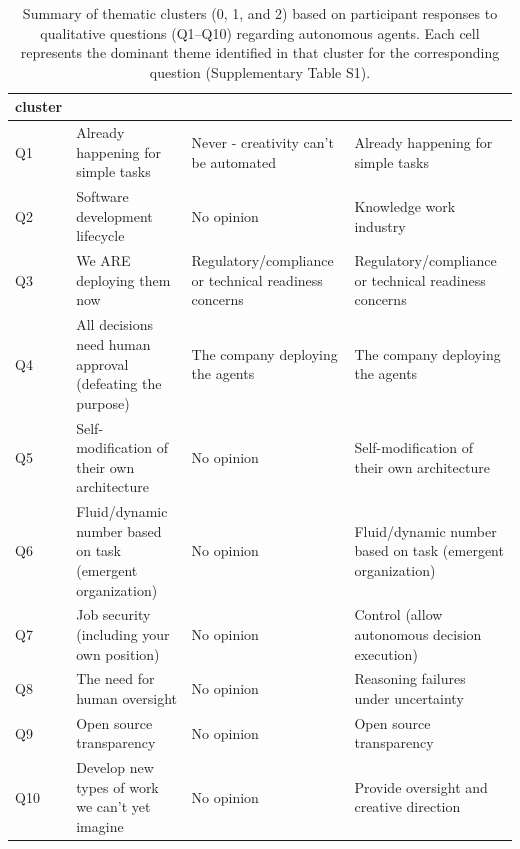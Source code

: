 \documentclass{article}
\begin{document}
\begin{table}[htbp]
	\caption{Summary of thematic clusters (0, 1, and 2) based on participant responses to qualitative questions (Q1--Q10) regarding autonomous agents. Each cell represents the dominant theme identified in that cluster for the corresponding question (Supplementary Table S1).}\label{table:kmodes_clusters}
	\centering
	\begin{tabularx}{\textwidth}{l>{\raggedright\arraybackslash}X >{\raggedright\arraybackslash}X >{\raggedright\arraybackslash}X}
		\toprule
		cluster & 0                                                          & 1                                                     & 2                                                          \\
		\midrule
		Q1      & Already happening for simple tasks                         & Never - creativity can't be automated                 & Already happening for simple tasks                         \\
		Q2      & Software development lifecycle                             & No opinion                                            & Knowledge work industry                                    \\
		Q3      & We ARE deploying them now                                  & Regulatory/compliance or technical readiness concerns & Regulatory/compliance or technical readiness concerns      \\
		Q4      & All decisions need human approval (defeating the purpose)  & The company deploying the agents                      & The company deploying the agents                           \\
		Q5      & Self-modification of their own architecture                & No opinion                                            & Self-modification of their own architecture                \\
		Q6      & Fluid/dynamic number based on task (emergent organization) & No opinion                                            & Fluid/dynamic number based on task (emergent organization) \\
		Q7      & Job security (including your own position)                 & No opinion                                            & Control (allow autonomous decision execution)              \\
		Q8      & The need for human oversight                               & No opinion                                            & Reasoning failures under uncertainty                       \\
		Q9      & Open source transparency                                   & No opinion                                            & Open source transparency                                   \\
		Q10     & Develop new types of work we can't yet imagine             & No opinion                                            & Provide oversight and creative direction                   \\
		\bottomrule
	\end{tabularx}
\end{table}
\end{document}
